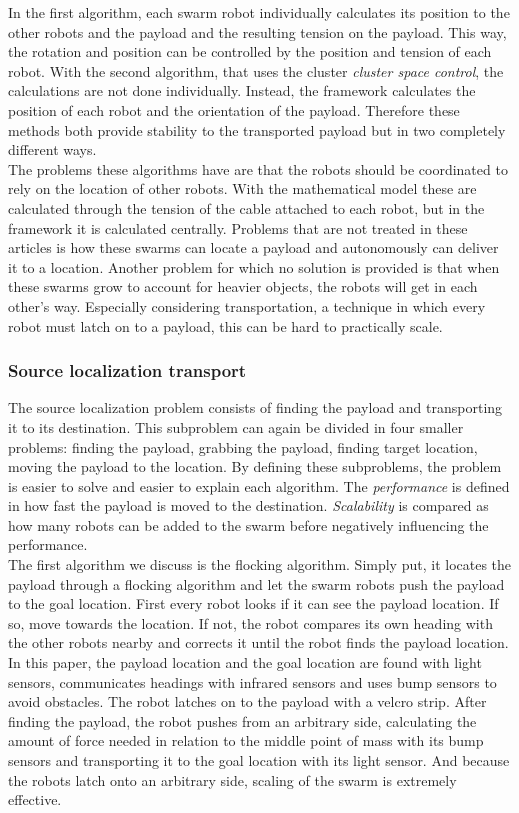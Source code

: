 In the first algorithm, each swarm robot individually calculates its position to the other robots and the payload and the resulting tension on the payload. 
This way, the rotation and position can be controlled by the position and tension of each robot. 
With the second algorithm, that uses the cluster \emph{cluster space control}, the calculations are not done individually. 
Instead, the framework calculates the position of each robot and the orientation of the payload. 
Therefore these methods both provide stability to the transported payload but in two completely different ways. \\

The problems these algorithms have are that the robots should be coordinated to rely on the location of other robots.
With the mathematical model these are calculated through the tension of the cable attached to each robot, but in the framework it is calculated centrally. 
Problems that are not treated in these articles is how these swarms can locate a payload and autonomously can deliver it to a location. 
Another problem for which no solution is provided is that when these swarms grow to account for heavier objects, the robots will get in each other's way. 
Especially considering transportation, a technique in which every robot must latch on to a payload, this can be hard to practically scale. 

\subsubsection{Source localization transport}
The source localization problem consists of finding the payload and transporting it to its destination.
This subproblem can again be divided in four smaller problems: finding the payload, grabbing the payload, finding target location, moving the payload to the location.
By defining these subproblems, the problem is easier to solve and easier to explain each algorithm. 
The \emph{performance} is defined in how fast the payload is moved to the destination. 
\emph{Scalability} is compared as how many robots can be added to the swarm before negatively influencing the performance. \\

The first algorithm we discuss is the flocking algorithm. \cite{Rubenstein2013collecive}
Simply put, it locates the payload through a flocking algorithm and let the swarm robots push the payload to the goal location. 
First every robot looks if it can see the payload location. If so, move towards the location. 
If not, the robot compares its own heading with the other robots nearby and corrects it until the robot finds the payload location.
In this paper, the payload location and the goal location are found with light sensors, communicates headings with infrared sensors and uses bump sensors to avoid obstacles. 
The robot latches on to the payload with a velcro strip.
After finding the payload, the robot pushes from an arbitrary side, calculating the amount of force needed in relation to the middle point of mass with its bump sensors and transporting it to the goal location with its light sensor.  
And because the robots latch onto an arbitrary side, scaling of the swarm is extremely effective. \\ 

